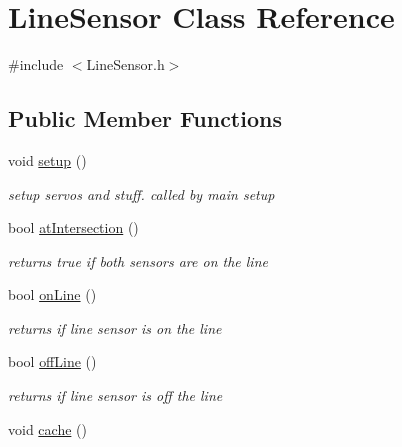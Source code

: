 \hypertarget{classLineSensor}{\section{Line\-Sensor Class Reference}
\label{classLineSensor}
}


{\ttfamily \#include $<$Line\-Sensor.\-h$>$}

\subsection*{Public Member Functions}
\begin{DoxyCompactItemize}
\item 
\hypertarget{classLineSensor_a555f6f7222ea1e76ed810edbde44c39c}{void \hyperlink{classLineSensor_a555f6f7222ea1e76ed810edbde44c39c}{setup} ()}\label{classLineSensor_a555f6f7222ea1e76ed810edbde44c39c}

\begin{DoxyCompactList}\small\item\em setup servos and stuff. called by main setup \end{DoxyCompactList}\item 
\hypertarget{classLineSensor_a6769cf781edb7ac4a43086cd62be01e2}{bool \hyperlink{classLineSensor_a6769cf781edb7ac4a43086cd62be01e2}{at\-Intersection} ()}\label{classLineSensor_a6769cf781edb7ac4a43086cd62be01e2}

\begin{DoxyCompactList}\small\item\em returns true if both sensors are on the line \end{DoxyCompactList}\item 
\hypertarget{classLineSensor_ad9d3c5a694f1ff946d1137df1694b026}{bool \hyperlink{classLineSensor_ad9d3c5a694f1ff946d1137df1694b026}{on\-Line} ()}\label{classLineSensor_ad9d3c5a694f1ff946d1137df1694b026}

\begin{DoxyCompactList}\small\item\em returns if line sensor is on the line \end{DoxyCompactList}\item 
\hypertarget{classLineSensor_a0dea8f6d7e7e27d050feecb3e549a149}{bool \hyperlink{classLineSensor_a0dea8f6d7e7e27d050feecb3e549a149}{off\-Line} ()}\label{classLineSensor_a0dea8f6d7e7e27d050feecb3e549a149}

\begin{DoxyCompactList}\small\item\em returns if line sensor is off the line \end{DoxyCompactList}\item 
\hypertarget{classLineSensor_afc809d2aa49426d949f76f68b0154050}{void \hyperlink{classLineSensor_afc809d2aa49426d949f76f68b0154050}{cache} ()}\label{classLineSensor_afc809d2aa49426d949f76f68b0154050}


\end{DoxyCompactItemize}
